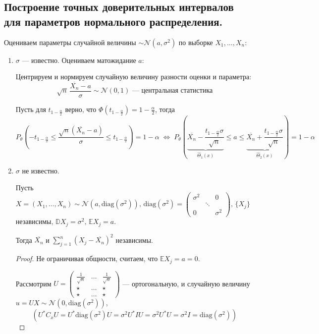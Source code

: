 \subsection{Построение точных доверительных интервалов для параметров нормального распределения.}

Оцениваем параметры случайной величины $\sim \mathcal{N}(a, \sigma^2)$ по выборке $X_1, \dots, X_n$:
\begin{enumerate}
	\item $\sigma$ --- известно. Оцениваем матожидание $a$:
	
	Центрируем и нормируем случайную величину разности оценки и параметра:
	\[ \sqrt{n}\,\frac{\overline{X_n} - a}{\sigma} \sim \mathcal{N}(0, 1) \text{ --- центральная статистика} \]
	
	Пусть для $t_{1-\frac{\alpha}2}$ верно, что $\Phi \left( t_{1 - \frac{\alpha}2} \right) = 1 - \frac{\alpha}2$, тогда 
	\[ P_{\theta} \left( -t_{1 - \frac{\alpha}2} \le \frac{\sqrt{n}(\overline{X_n} - a)}{\sigma} \le t_{1 - \frac{\alpha}2} \right) = 
	1 - \alpha \;\Leftrightarrow\; 
	P_{\theta} \left( \underset{\hat\Theta_1(x)}{\underbrace{\overline{X_n} - \frac{t_{1 - \frac{\alpha}2} \sigma}{\sqrt{n}}}} \le a \le 
	\underset{\hat\Theta_2(x)}{\underbrace{\overline{X_n} + \frac{t_{1 - \frac{\alpha}2} \sigma}{\sqrt{n}}}} \right) = 1 - \alpha \]
	
	\item $\sigma$ не известно.
	
	\begin{lemma*}
		Пусть $X \!=\! (X_1, \dots, X_n) \sim \mathcal{N} \left( a, \text{diag}(\sigma^2) \right), \, \text{diag}(\sigma^2) \!=\! 
		\left(\begin{matrix} \sigma^2 && 0 \\[-5 pt] & \!\!\!\!\!\ddots\!\!\!\!\! & \\[-5 pt] 0 && \sigma^2 \end{matrix}\right)\!\!, \, \{ X_j \}$ независимы, $\mathbb{D} X_j \!=\! \sigma^2\!, \, \mathbb{E} X_j \!=\! a$.
		
		Тогда $\overline{X_n}$ и $\sum_{j=1}^n (X_j - \overline{X_n})^2$ независимы.
	\end{lemma*}
	\begin{proof}
		Не ограничивая общности, считаем, что $\mathbb{E} X_j = a = 0$.
		
		Рассмотрим $U = \left(\begin{matrix} \frac1{\sqrt{n}} & \dots & \frac1{\sqrt{n}} \\[-0 pt] \star & \dots & \star \\[-0 pt] \star & \dots & \star \end{matrix}\right)$ --- ортогональную, и случайную величину $u = UX \sim \mathcal{N}(0, \text{diag}(\sigma^2))$, 
		\[ \left( U^{*} C_x U = U^{*}\text{diag}(\sigma^2)U = \sigma^2 U^{*} I U = \sigma^2 U^{*} U = \sigma^2 I = \text{diag}(\sigma^2) \right) \]
		

\end{proof}
\end{enumerate}
